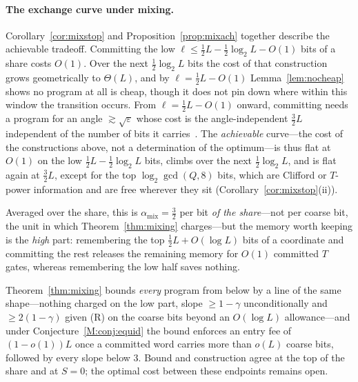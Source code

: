\documentclass[aps,prx,twocolumn,superscriptaddress,nofootinbib,longbibliography]{revtex4-2}
\theoremstyle{plain}
\theoremstyle{definition}
\theoremstyle{remark}
\begin{document}
\paragraph{The exchange curve under mixing.} Corollary~\ref{cor:mixstop} and Proposition~\ref{prop:mixach} together describe the achievable tradeoff. Committing the low $\ell\le\tfrac12L-\tfrac12\log_2L-O(1)$ bits of a share costs $O(1)$. Over the next $\tfrac12\log_2L$ bits the cost of that construction grows geometrically to $\Theta(L)$, and by $\ell=\tfrac12L-O(1)$ Lemma~\ref{lem:nocheap} shows no program at all is cheap, though it does not pin down where within this window the transition occurs. From $\ell=\tfrac12L-O(1)$ onward, committing needs a program for an angle $\gtrsim\sqrt\varepsilon$ whose cost is the angle-independent $\tfrac32L$ independent of the number of bits it carries~\cite{KLMPP,Bothe}. The \emph{achievable} curve---the cost of the constructions above, not a determination of the optimum---is thus flat at $O(1)$ on the low $\tfrac12L-\tfrac12\log_2L$ bits, climbs over the next $\tfrac12\log_2L$, and is flat again at $\tfrac32L$, except for the top $\log_2\gcd(Q,8)$ bits, which are Clifford or $T$-power information and are free wherever they sit (Corollary~\ref{cor:mixstop}(ii)). 

Averaged over the share, this is $\alpha_{\mathrm{mix}}=\tfrac32$ per bit \emph{of the share}---not per coarse bit, the unit in which Theorem~\ref{thm:mixing} charges---but the memory worth keeping is the \emph{high} part: remembering the top $\tfrac12L+O(\log L)$ bits of a coordinate and committing the rest releases the remaining memory for $O(1)$ committed $T$ gates, whereas remembering the low half saves nothing. 

Theorem~\ref{thm:mixing} bounds \emph{every} program from below by a line of the same shape---nothing charged on the low part, slope $\ge1-\gamma$ unconditionally and $\ge2(1-\gamma)$ given (R) on the coarse bits beyond an $O(\log L)$ allowance---and under Conjecture~\ref{M:conj:equid} the bound enforces an entry fee of $(1-o(1))L$ once a committed word carries more than $o(L)$ coarse bits, followed by every slope below $3$. Bound and construction agree at the top of the share and at $S=0$; the optimal cost between these endpoints remains open.
\end{document}
